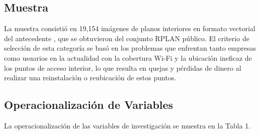 \subsection{Muestra}
La muestra consistió en 19,154 imágenes de planos interiores en formato vectorial del antecedente \cite{art_wu2019interior}, que se obtuvieron del conjunto RPLAN público. El criterio de selección de esta categoría se basó en los problemas que enfrentan tanto empresas como usuarios en la actualidad con la cobertura Wi-Fi y la ubicación ineficaz de los puntos de acceso interior, lo que resulta en quejas y pérdidas de dinero al realizar una reinstalación o reubicación de estos puntos.

\subsection{Operacionalización de Variables}
La operacionalización de las variables de investigación se muestra en la Tabla 1.


